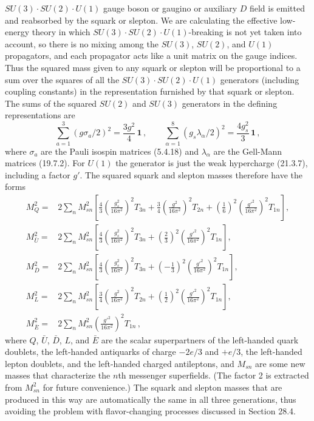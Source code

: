 \(SU(3)\mathbin{\cdot}SU(2)\mathbin{\cdot}U(1)\) gauge boson or gaugino
or auxiliary \(D\) field is emitted and reabsorbed by the squark or
slepton. We are calculating the effective low-energy theory in which
\(SU(3)\mathbin{\cdot}SU(2)\mathbin{\cdot}U(1)\)-breaking is not yet taken
into account, so there is no mixing among the \(SU(3)\), \(SU(2)\), and
\(U(1)\) propagators, and each propagator acts like a unit matrix on the
gauge indices. Thus the squared mass given to any squark or slepton will be
proportional to a sum over the squares of all the
\(SU(3)\mathbin{\cdot}SU(2)\mathbin{\cdot}U(1)\) generators (including
coupling constants) in the representation furnished by that squark or
slepton. The sums of the squared \(SU(2)\) and \(SU(3)\) generators in the
defining representations are
\[
  \sum_{a=1}^{3}(g\sigma_a/2)^2
  =\frac{3g^2}{4}\,\mathbf{1}\,,
  \qquad
  \sum_{\alpha=1}^{8}(g_s\lambda_\alpha/2)^2
  =\frac{4g_s^2}{3}\,\mathbf{1}\,,
\]
where \(\sigma_a\) are the Pauli isospin matrices (5.4.18) and
\(\lambda_\alpha\) are the Gell-Mann matrices (19.7.2). For \(U(1)\) the
generator is just the weak hypercharge (21.3.7), including a factor \(g'\).
The squared squark and slepton masses therefore have the forms
\begin{equation}
  \begin{aligned}
    M_Q^2={}&2\sum_n M_{sn}^2
      \left[
        \frac{4}{3}\left(\frac{g_s^2}{16\pi^2}\right)^2T_{3n}
        +\frac{3}{4}\left(\frac{g^2}{16\pi^2}\right)^2T_{2n}
        +\left(\frac{1}{6}\right)^2
          \left(\frac{g'^2}{16\pi^2}\right)^2T_{1n}
      \right],\\
    M_{\bar U}^2={}&2\sum_n M_{sn}^2
      \left[
        \frac{4}{3}\left(\frac{g_s^2}{16\pi^2}\right)^2T_{3n}
        +\left(\frac{2}{3}\right)^2
          \left(\frac{g'^2}{16\pi^2}\right)^2T_{1n}
      \right],\\
    M_{\bar D}^2={}&2\sum_n M_{sn}^2
      \left[
        \frac{4}{3}\left(\frac{g_s^2}{16\pi^2}\right)^2T_{3n}
        +\left(-\frac{1}{3}\right)^2
          \left(\frac{g'^2}{16\pi^2}\right)^2T_{1n}
      \right],\\
    M_L^2={}&2\sum_n M_{sn}^2
      \left[
        \frac{3}{4}\left(\frac{g^2}{16\pi^2}\right)^2T_{2n}
        +\left(\frac{1}{2}\right)^2
          \left(\frac{g'^2}{16\pi^2}\right)^2T_{1n}
      \right],\\
    M_{\bar E}^2={}&2\sum_n M_{sn}^2
      \left(\frac{g'^2}{16\pi^2}\right)^2T_{1n}\,,
  \end{aligned}
  \tag{28.6.4}\label{eq:28.6.4}
\end{equation}
where \(Q\), \(\bar U\), \(\bar D\), \(L\), and \(\bar E\) are the scalar
superpartners of the left-handed quark doublets, the left-handed
antiquarks of charge \(-2e/3\) and \(+e/3\), the left-handed lepton
doublets, and the left-handed charged antileptons, and \(M_{sn}\) are some
new masses that characterize the \(n\)th messenger superfields. (The
factor 2 is extracted from \(M_{sn}^2\) for future convenience.) The
squark and slepton masses that are produced in this way are automatically
the same in all three generations, thus avoiding the problem with
flavor-changing processes discussed in Section 28.4.

